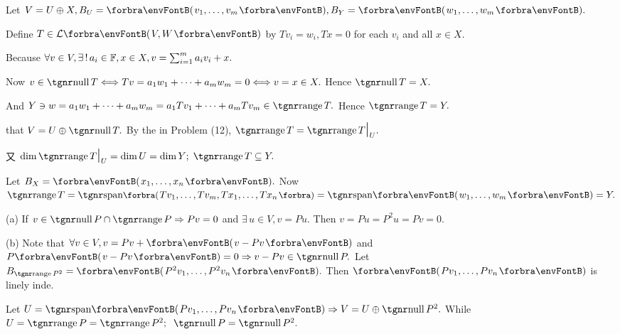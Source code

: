 
\par\quad
Let $V=U\oplus X,B_U=\Par{v_1,\dots,v_m},B_Y=\Par{w_1,\dots,w_m}.$\par\quad
Define $T\in\Lm{V,W}$ by $T{v_i}=w_i,Tx=0$ for each $v_i$ and all $x\in X.$\par\quad
Because $\forall v\in V,\exists\,!\,a_i\in{\mathbb{F}},x\in X,v=\sum_{i=1}^m a_i v_i+x.$\par\quad
Now $v\in\null T\Longleftrightarrow Tv=a_1w_1+\dots+a_mw_m=0\Longleftrightarrow v=x\in X.$ \;Hence $\null T=X.$\par\quad
And $Y\ni w=a_1 w_1+\dots+a_m w_m=a_1 Tv_1+\dots+a_m Tv_m\in\range T.$ \;Hence $\range T=Y.$\par\quad
\Or \NOTICE that $V=U\oplus\null T.$ By the {\COROLLARY} in Problem (12), $\range T=\range T\mmid_U.$\par\quad
{\Blind{\Or}}又 $\dim\range T\mmid_U=\dim U=\dim Y;\;\range T\subseteq Y.$\par\quad
\Or Let $B_X=\Par{x_1,\dots,x_n}.$ Now $\range T=\Span[\BigPar]{Tv_1,\dots,Tv_m,Tx_1,\dots,Tx_n}=\Span{w_1,\dots,w_m}=Y.$\PfEnd
\SepLine

\par\quad
(a) If $v\in\null P\cap\range P\Rightarrow Pv=0$ and $\exists\,u\in V,v=Pu.$ Then $v=Pu=P^2 u=Pv=0.$\par\quad
(b) Note that $\forall v\in V,v=Pv+\Par{v-Pv}$ and $P\Par{v-Pv}=0\Rightarrow v-Pv\in\null P.$\PfEnd\vspace{4pt}\quad
\Or {} \;Let $B_{\range P^2}=\Par{P^2 v_1,\dots,P^2 v_n}.$ Then $\Par{Pv_1,\dots,Pv_n}$ is linely inde.\par\quad
Let $U=\Span{Pv_1,\dots,Pv_n}\Rightarrow V=U\oplus\null P^2.$ \;While $U=\range P=\range P^2;\;\;\null P=\null P^2.$\PfEnd
\SepLine

